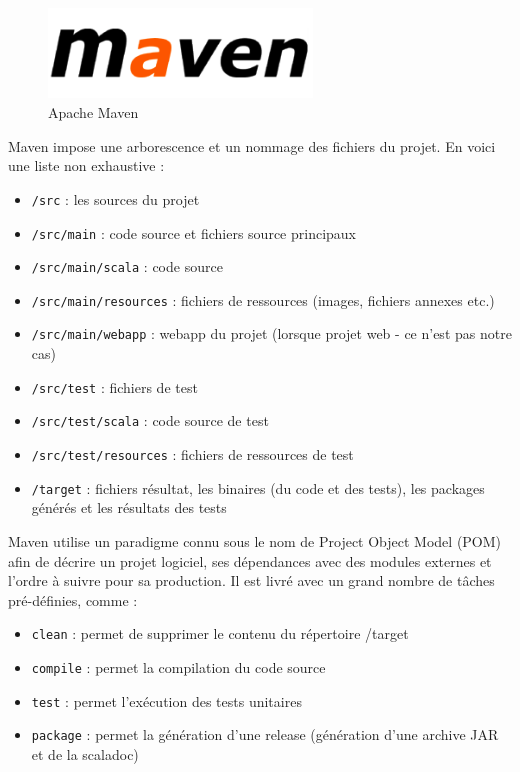 \documentclass[a4paper,11pt]{article}
\begin{document}
	\begin{figure}[!ht]
		\center
		\includegraphics [width=70mm]{./images/maven.png}
		\caption{Apache Maven}
	\end{figure}

Maven impose une arborescence et un nommage des fichiers du projet. En voici une liste non exhaustive :
	\begin{itemize}
		\item \texttt{/src} : les sources du projet
		\item \texttt{/src/main} : code source et fichiers source principaux
		\item \texttt{/src/main/scala} : code source
		\item \texttt{/src/main/resources} : fichiers de ressources (images, fichiers annexes etc.)
		\item \texttt{/src/main/webapp} : webapp du projet (lorsque projet web - ce n'est pas notre cas)
		\item \texttt{/src/test} : fichiers de test
		\item \texttt{/src/test/scala} : code source de test
		\item \texttt{/src/test/resources} : fichiers de ressources de test
		\item \texttt{/target} : fichiers résultat, les binaires (du code et des tests), les packages générés et les résultats des tests
	\end{itemize}
	
Maven utilise un paradigme connu sous le nom de Project Object Model (POM) afin de décrire un projet logiciel, ses dépendances avec des modules externes et l'ordre à suivre pour sa production. Il est livré avec un grand nombre de tâches pré-définies, comme :
	\begin{itemize}
		\item \texttt{clean} : permet de supprimer le contenu du répertoire /target
		\item \texttt{compile} : permet la compilation du code source
    	\item \texttt{test} : permet l'exécution des tests unitaires
    	\item \texttt{package} : permet la génération d'une release (génération d'une archive JAR et de la scaladoc)
	\end{itemize}
\end{document}
